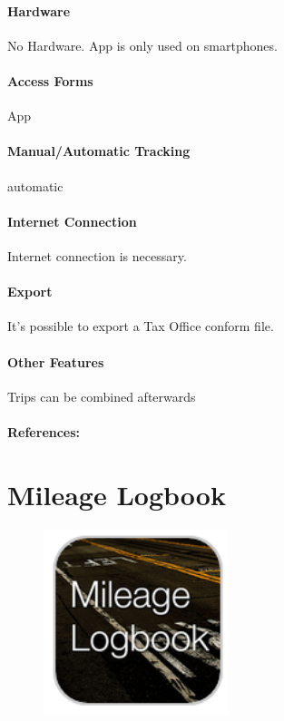 \paragraph{Hardware} No Hardware. App is only used on smartphones.
\paragraph{Access Forms} App
\paragraph{Manual/Automatic Tracking} automatic
\paragraph{Internet Connection} Internet connection is necessary.
\paragraph{Export} It’s possible to export a Tax Office conform file.
\paragraph{Other Features}Trips can be combined afterwards
\paragraph{References:} \cite{TOUR}
\newpage

\section{Mileage Logbook}
\begin{figure}
  \begin{center}
    \includegraphics[width=0.48\textwidth]{bilder/mileage}
  \end{center}
\end{figure}
